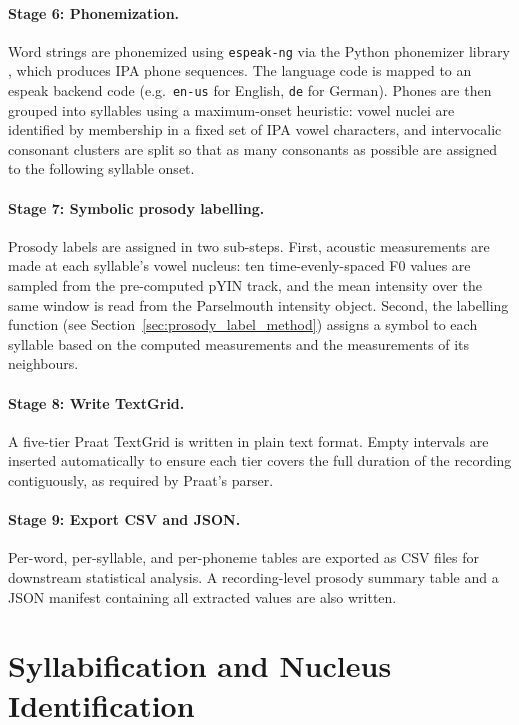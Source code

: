 \paragraph{Stage 6: Phonemization.}
Word strings are phonemized using \texttt{espeak-ng} via the Python phonemizer
library \cite{barnard2021phonemizer}, which produces IPA phone sequences. The
language code is mapped to an espeak backend code (e.g.\ \texttt{en-us} for
English, \texttt{de} for German). Phones are then grouped into syllables using a
maximum-onset heuristic: vowel nuclei are identified by membership in a fixed set
of IPA vowel characters, and intervocalic consonant clusters are split so that as
many consonants as possible are assigned to the following syllable onset.

\paragraph{Stage 7: Symbolic prosody labelling.}
Prosody labels are assigned in two sub-steps. First, acoustic measurements are
made at each syllable's vowel nucleus: ten time-evenly-spaced F0 values are
sampled from the pre-computed pYIN track, and the mean intensity over the same
window is read from the Parselmouth intensity object. Second, the labelling
function (see Section~\ref{sec:prosody_label_method}) assigns a symbol to each
syllable based on the computed measurements and the measurements of its
neighbours.

\paragraph{Stage 8: Write TextGrid.}
A five-tier Praat TextGrid is written in plain text format. Empty intervals are
inserted automatically to ensure each tier covers the full duration of the
recording contiguously, as required by Praat's parser.

\paragraph{Stage 9: Export CSV and JSON.}
Per-word, per-syllable, and per-phoneme tables are exported as CSV files for
downstream statistical analysis. A recording-level prosody summary table and a
JSON manifest containing all extracted values are also written.

\section{Syllabification and Nucleus Identification}
\label{sec:syllabification}

